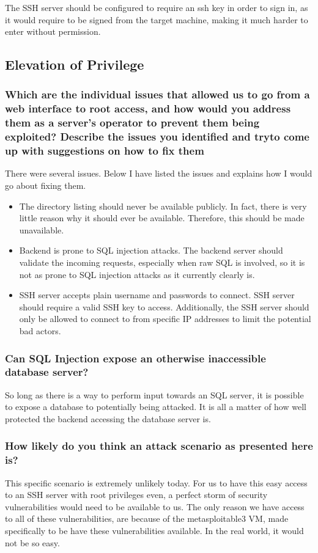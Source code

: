 The SSH server should be configured to require an ssh key in order to sign in, as it would require to be signed from the target machine, making it much harder to enter without permission.

\subsection{Elevation of Privilege}
\subsubsection{Which are the individual issues that allowed us to go from a web interface to root access, and how would you address them as a server's operator to prevent them being exploited? Describe the issues you identified and tryto come up with suggestions on how to fix them}

There were several issues. Below I have listed the issues and explains how I would go about fixing them.

\begin{itemize}
  \item The directory listing should never be available publicly. In fact, there is very little reason why it should ever be available. Therefore, this should be made unavailable.
  \item Backend is prone to SQL injection attacks. The backend server should validate the incoming requests, especially when raw SQL is involved, so it is not as prone to SQL injection attacks as it currently clearly is.
  \item SSH server accepts plain username and passwords to connect. SSH server should require a valid SSH key to access. Additionally, the SSH server should only be allowed to connect to from specific IP addresses to limit the potential bad actors.
\end{itemize}

\subsubsection{Can SQL Injection expose an otherwise inaccessible database server?}
So long as there is a way to perform input towards an SQL server, it is possible to expose a database to potentially being attacked. It is all a matter of how well protected the backend accessing the database server is.

\subsubsection{How likely do you think an attack scenario as presented here is?}
This specific scenario is extremely unlikely today. For us to have this easy access to an SSH server with root privileges even, a perfect storm of security vulnerabilities would need to be available to us. The only reason we have access to all of these vulnerabilities, are because of the metasploitable3 VM, made specifically to be have these vulnerabilities available. In the real world, it would not be so easy.

